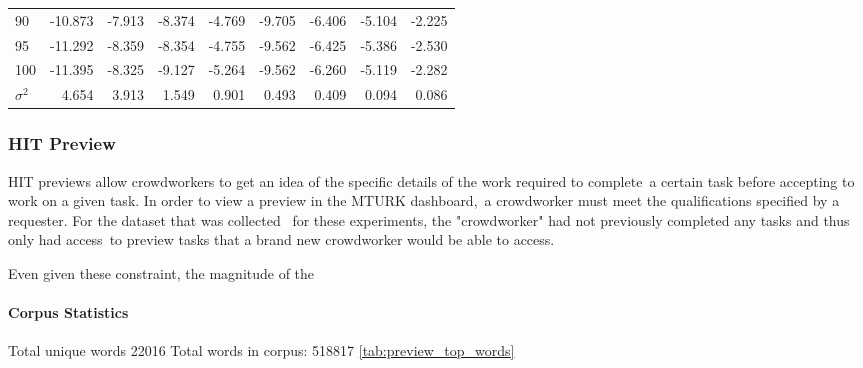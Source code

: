 \documentclass[letterpaper,12pt]{article}
\begin{document}
\begin{table}
\begin{center}
\begin{tabular}{|l|rr|rr|rr|rr|}
			90  & -10.873 & -7.913 & -8.374 & -4.769 &  -9.705 & -6.406 & -5.104 & -2.225 \\
			95  & -11.292 & -8.359 & -8.354 & -4.755 &  -9.562 & -6.425 & -5.386 & -2.530 \\
			100 & -11.395 & -8.325 & -9.127 & -5.264 &  -9.562 & -6.260 & -5.119 & -2.282 \\
			\hline
			$\sigma^2$ & 4.654 & 3.913 & 1.549 & 0.901 & 0.493 & 0.409 & 0.094 & 0.086 \\ 
			\hline
			\end{tabular}
	\end{center}
\end{table}



\newpage
\subsubsection{HIT Preview}
HIT previews allow crowdworkers to get an idea of the specific details of the work required to complete\
a certain task before accepting to work on a given task. In order to view a preview in the MTURK dashboard,\
a crowdworker must meet the qualifications specified by a requester. For the dataset that was collected \
for these experiments, the "crowdworker" had not previously completed any tasks and thus only had access\
to preview tasks that a brand new crowdworker would be able to access.

Even given these constraint, the magnitude of the 

\paragraph{Corpus Statistics}
Total unique words 22016
Total words in corpus: 518817
\ref{tab:preview_top_words}
\end{document}
